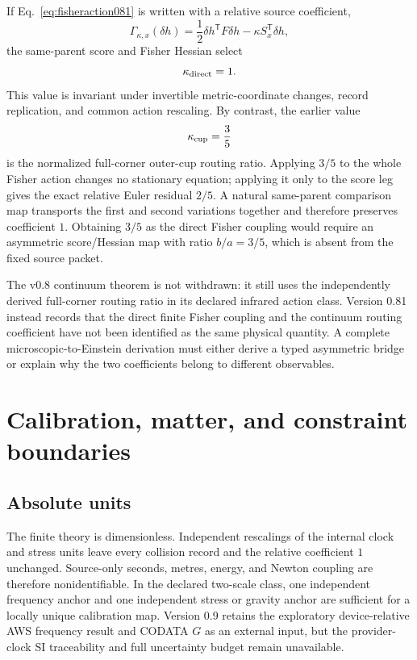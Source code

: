 \documentclass[11pt]{article}
\theoremstyle{definition}
\theoremstyle{remark}
\begin{document}
If Eq.~\eqref{eq:fisheraction081} is written with a relative source coefficient,
\begin{equation}
 \Gamma_{\kappa,x}(\delta h)
 =\frac12\delta h^{\mathsf T}F\delta h
 -\kappa S_x^{\mathsf T}\delta h,
\end{equation}
the same-parent score and Fisher Hessian select
\begin{equation}
 \kappa_{\rm direct}=1.
\end{equation}
This value is invariant under invertible metric-coordinate changes, record replication, and common action rescaling. By contrast, the earlier value
\begin{equation}
 \kappa_{\rm cup}=\frac35
\end{equation}
is the normalized full-corner outer-cup routing ratio. Applying $3/5$ to the whole Fisher action changes no stationary equation; applying it only to the score leg gives the exact relative Euler residual $2/5$. A natural same-parent comparison map transports the first and second variations together and therefore preserves coefficient $1$. Obtaining $3/5$ as the direct Fisher coupling would require an asymmetric score/Hessian map with ratio $b/a=3/5$, which is absent from the fixed source packet.

The v0.8 continuum theorem is not withdrawn: it still uses the independently derived full-corner routing ratio in its declared infrared action class. Version 0.81 instead records that the direct finite Fisher coupling and the continuum routing coefficient have not been identified as the same physical quantity. A complete microscopic-to-Einstein derivation must either derive a typed asymmetric bridge or explain why the two coefficients belong to different observables.

\section{Calibration, matter, and constraint boundaries}\label{sec:boundaries081}

\subsection{Absolute units}

The finite theory is dimensionless. Independent rescalings of the internal clock and stress units leave every collision record and the relative coefficient $1$ unchanged. Source-only seconds, metres, energy, and Newton coupling are therefore nonidentifiable. In the declared two-scale class, one independent frequency anchor and one independent stress or gravity anchor are sufficient for a locally unique calibration map. Version 0.9 retains the exploratory device-relative AWS frequency result and CODATA $G$ as an external input, but the provider-clock SI traceability and full uncertainty budget remain unavailable.
\end{document}
